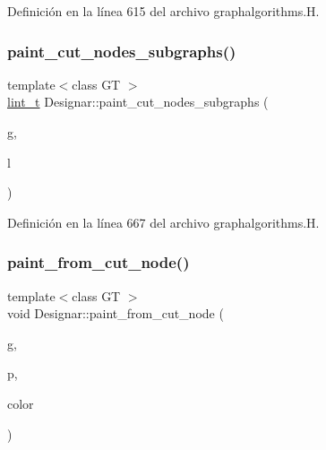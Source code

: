 Definición en la línea 615 del archivo graphalgorithms.\+H.

\mbox{\label{namespace_designar_a4a53202e6320a9435f829867671c26c1}} 
\subsubsection{\texorpdfstring{paint\+\_\+cut\+\_\+nodes\+\_\+subgraphs()}{paint\_cut\_nodes\_subgraphs()}}
{\footnotesize\ttfamily template$<$class GT $>$ \\
\hyperlink{namespace_designar_a9d113d66a39e82b73727c72cd3a52f73}{lint\+\_\+t} Designar\+::paint\+\_\+cut\+\_\+nodes\+\_\+subgraphs (\begin{DoxyParamCaption}\item[{\hyperlink{demo-buildgraph_8_c_a3001c40d2c31ca87ed96cd7d1334a55e}{GT} \&}]{g,  }\item[{const \hyperlink{class_designar_1_1_s_l_list}{S\+L\+List}$<$ \hyperlink{namespace_designar_a5af326c65aa2bd26b26c410f2030d09e}{Node}$<$ \hyperlink{demo-buildgraph_8_c_a3001c40d2c31ca87ed96cd7d1334a55e}{GT} $>$ $\ast$$>$ \&}]{l }\end{DoxyParamCaption})}



Definición en la línea 667 del archivo graphalgorithms.\+H.

\mbox{\label{namespace_designar_a0b57b399593e711bef1c99a4c41c238a}} 
\subsubsection{\texorpdfstring{paint\+\_\+from\+\_\+cut\+\_\+node()}{paint\_from\_cut\_node()}}
{\footnotesize\ttfamily template$<$class GT $>$ \\
void Designar\+::paint\+\_\+from\+\_\+cut\+\_\+node (\begin{DoxyParamCaption}\item[{\hyperlink{demo-buildgraph_8_c_a3001c40d2c31ca87ed96cd7d1334a55e}{GT} \&}]{g,  }\item[{\hyperlink{namespace_designar_a5af326c65aa2bd26b26c410f2030d09e}{Node}$<$ \hyperlink{demo-buildgraph_8_c_a3001c40d2c31ca87ed96cd7d1334a55e}{GT} $>$ \&}]{p,  }\item[{\hyperlink{namespace_designar_a9d113d66a39e82b73727c72cd3a52f73}{lint\+\_\+t} \&}]{color }\end{DoxyParamCaption})}




